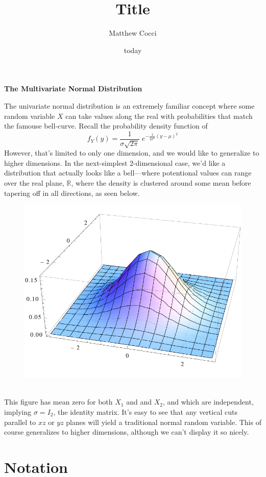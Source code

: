 \documentclass[a4paper,12pt]{scrartcl}
\author{Matthew Cocci}
\title{Title}
\date{today}
\begin{document}
\begin{center} \LARGE \bf
   The Multivariate Normal Distribution
\end{center}

The univariate normal distribution is an extremely familiar concept
where some random variable $X$ can take values along the real with 
probabilities that match the famouse bell-curve. Recall 
the probability density function of
   \[ f_Y(y) = \frac{1}{\sigma \sqrt{2\pi}} \; e^{-\frac{1}{2\sigma^2}
      (y - \mu)^2} \]
However, that's 
limited to only one dimension, and we would like to generalize to 
higher dimensions. In the next-simplest
2-dimensional case, we'd like a distribution
that actually looks like a bell---where potentional values can
range over the real plane, $\mathbb{R}$, where the density is
clustered around some mean before tapering off in all directions, 
as seen below.
\begin{figure}[h!]
   \centering
   \includegraphics[scale=0.60]{multivariate.pdf}
\end{figure}
\\
This figure has mean zero for both $X_1$ and and $X_2$, and 
which are independent, implying $\sigma = I_2$, the identity matrix. 
It's easy to see that any vertical cuts parallel to $xz$ or $yz$ planes
will yield a traditional normal random variable. This of course 
generalizes to higher dimensions, although we can't display it so nicely.

\section{Notation}
\end{document}
